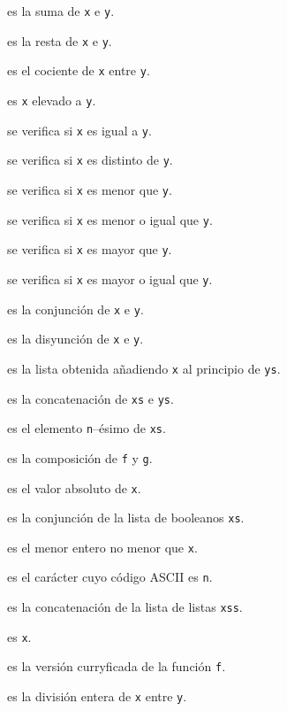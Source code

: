 \begin{enumerate*}
\item {} es la suma de \verb|x| e \verb|y|.
\item {} es la resta de \verb|x| e \verb|y|.
\item {} es el cociente de \verb|x| entre \verb|y|.
\item {} es \verb|x| elevado a \verb|y|.
\item {} se verifica si \verb|x| es igual a \verb|y|.
\item {} se verifica si \verb|x| es distinto de \verb|y|.
\item {} se verifica si \verb|x| es menor que \verb|y|.
\item {} se verifica si \verb|x| es menor o igual que \verb|y|.
\item {} se verifica si \verb|x| es mayor que \verb|y|.
\item {} se verifica si \verb|x| es mayor o igual que \verb|y|.
\item {} es la conjunción de \verb|x| e \verb|y|.
\item {} es la disyunción de \verb|x| e \verb|y|.
\item {} es la lista obtenida añadiendo \verb|x| al principio de
  \verb|ys|.
\item {} es la concatenación de \verb|xs| e \verb|ys|.
\item {} es el elemento \verb|n|--ésimo de \verb|xs|.
\item {} es la composición de \verb|f| y \verb|g|.
\item {} es el valor absoluto de \verb|x|.
\item {} es la conjunción de la lista de booleanos \verb|xs|.
\item {} es el menor entero no menor que \verb|x|.
\item {} es el carácter cuyo código ASCII es \verb|n|.
\item {} es la concatenación de la lista de listas \verb|xss|.
\item {} es \verb|x|.
\item {} es la versión curryficada de la función \verb|f|.
\item {} es la división entera de \verb|x| entre \verb|y|.

\end{enumerate*}
